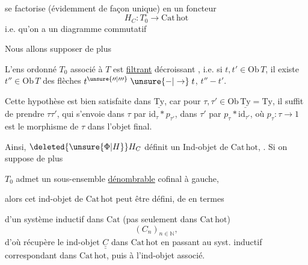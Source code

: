 
se factorise (évidemment de façon unique) en un foncteur
\[
H_C:T_0^\circ\longrightarrow\mathrm{Cat\,hot}
\]
i.e. qu'on a  un diagramme commutatif

Nous allons supposer de plus

L'ens ordonné $T_0$ associé à $T$ est \uline{filtrant} décroissant , i.e. si $t,t'\in\mathrm{Ob}\,T$, il existe $t''\in\mathrm{Ob}\,T$  des flèches $t^{\unsure{\prime\prime|\prime\prime\prime}}\mathrel{\unsure{-|\to}}t$, $t''\mathrel{-}t'$.

Cette hypothèse est bien satisfaite dans $\underline{\mathrm{Ty}}$, car pour $\tau,\tau'\in\mathrm{Ob}\,\underline{\mathrm{Ty}}=\mathrm{Ty}$, il suffit de prendre $\tau\tau'$, qui s'envoie dans $\tau$ par $\mathrm{id}_\tau*p_{\tau'}$, dans $\tau'$ par $p_\tau*\mathrm{id}_{\tau'}$, où $p_\tau:\tau\longrightarrow1$ est le morphisme de $\tau$ dans l'objet final. 

Ainsi, $\deleted{\unsure{\Phi|H}}H_C$ définit un Ind-objet de $\mathrm{Cat\,hot}$, . Si on suppose de plus

$T_0$ admet un sous-ensemble \uline{dénombrable} cofinal à gauche,

alors cet ind-objet de $\mathrm{Cat\,hot}$ peut être défini,   de \unsure{,} en termes


d'un système inductif dans $\mathrm{Cat}$ (pas seulement dans $\mathrm{Cat\,hot}$)
\[
(C_n)_{n\in\mathbb N},
\]
d'où  récupère le ind-objet $\underline{\underline C}$ dans $\mathrm{Cat\,hot}$ en passant au syst. inductif correspondant dans $\mathrm{Cat\,hot}$, puis à l'ind-objet associé.

